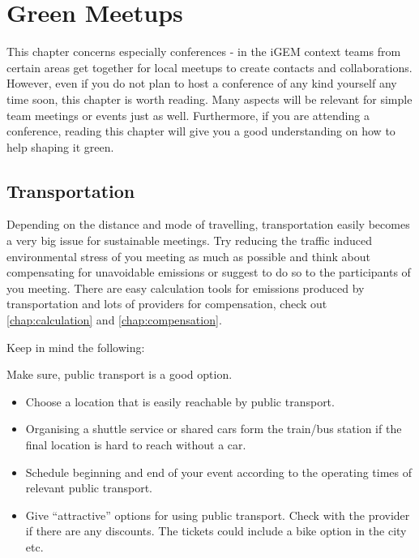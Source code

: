 
\chapter{Green Meetups}\label{chap:meetup}
This chapter concerns especially conferences - in the iGEM context teams from certain areas get together for local meetups to create contacts and collaborations. However, even if you do not plan to host a conference of any kind yourself any time soon, this chapter is worth reading. Many aspects will be relevant for simple team meetings or events just as well. Furthermore, if you are attending a conference, reading this chapter will give you a good understanding on how to help shaping it green.

\section{Transportation}
Depending on the distance and mode of travelling, transportation easily becomes a very big issue for sustainable meetings. Try reducing the traffic induced environmental stress of you meeting as much as possible and think about compensating for unavoidable emissions or suggest to do so to the participants of you meeting. There are easy calculation tools for emissions produced by transportation and lots of providers for compensation, check out \cref{chap:calculation} and \cref{chap:compensation}.

Keep in mind the following:

\begin{suggest}{Make sure, public transport is a good option.}
	\vspace{-2\topsep}
	\begin{itemize}
		\item Choose a location that is easily reachable by public transport.
		\item Organising a shuttle service or shared cars form the train/bus station if the final location is hard to reach without a car.
		\item Schedule beginning and end of your event according to the operating times of relevant public transport.
		\item Give ``attractive'' options for using public transport. Check with the provider if there are any discounts. The tickets could include a bike option in the city etc.
	\end{itemize}
\end{suggest}

